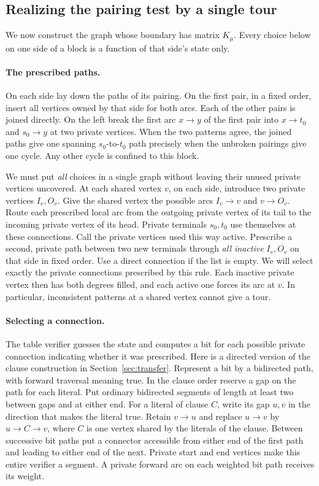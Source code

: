 \documentclass[11pt]{article}
\theoremstyle{definition}
\begin{document}
\subsection{Realizing the pairing test by a single tour}

We now construct the graph whose boundary has matrix \(K_\mu\). Every choice below on one side of a block is a function of that side's state only.

\paragraph{The prescribed paths.}
On each side lay down the paths of its pairing. On the first pair, in a fixed order, insert all vertices owned by that side for both arcs. Each of the other pairs is joined directly. On the left break the first arc \(x\to y\) of the first pair into \(x\to t_0\) and \(s_0\to y\) at two private vertices. When the two patterns agree, the joined paths give one spanning \(s_0\)-to-\(t_0\) path precisely when the unbroken pairings give one cycle. Any other cycle is confined to this block.

We must put \emph{all} choices in a single graph without leaving their unused private vertices uncovered. At each shared vertex \(v\), on each side, introduce two private vertices \(I_v,O_v\). Give the shared vertex the possible arcs \(I_v\to v\) and \(v\to O_v\). Route each prescribed local arc from the outgoing private vertex of its tail to the incoming private vertex of its head. Private terminals \(s_0,t_0\) use themselves at these connections. Call the private vertices used this way active. Prescribe a second, private path between two new terminals through \emph{all inactive} \(I_v,O_v\) on that side in fixed order. Use a direct connection if the list is empty. We will select exactly the private connections prescribed by this rule. Each inactive private vertex then has both degrees filled, and each active one forces its arc at \(v\). In particular, inconsistent patterns at a shared vertex cannot give a tour.

\paragraph{Selecting a connection.}
The table verifier guesses the state and computes a bit for each possible private connection indicating whether it was prescribed. Here is a directed version of the clause construction in Section~\ref{sec:transfer}. Represent a bit by a bidirected path, with forward traversal meaning true. In the clause order reserve a gap on the path for each literal. Put ordinary bidirected segments of length at least two between gaps and at either end. For a literal of clause \(C\), write its gap \(u,v\) in the direction that makes the literal true. Retain \(v\to u\) and replace \(u\to v\) by \(u\to C\to v\), where \(C\) is one vertex shared by the literals of the clause. Between successive bit paths put a connector accessible from either end of the first path and leading to either end of the next. Private start and end vertices make this entire verifier a segment. A private forward arc on each weighted bit path receives its weight.
\end{document}
